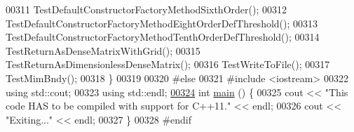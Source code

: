 \begin{DoxyCode}
00311   TestDefaultConstructorFactoryMethodSixthOrder();
00312   TestDefaultConstructorFactoryMethodEightOrderDefThreshold();
00313   TestDefaultConstructorFactoryMethodTenthOrderDefThreshold();
00314   TestReturnAsDenseMatrixWithGrid();
00315   TestReturnAsDimensionlessDenseMatrix();
00316   TestWriteToFile();
00317   TestMimBndy();
00318 \}
00319 
00320 \textcolor{preprocessor}{#else}
00321 \textcolor{preprocessor}{#include <iostream>}
00322 \textcolor{keyword}{using} std::cout;
00323 \textcolor{keyword}{using} std::endl;
\hypertarget{mtk__grad__1d__test_8cc_source_l00324}{}\hyperlink{mtk__grad__1d__test_8cc_ae66f6b31b5ad750f1fe042a706a4e3d4}{00324} \textcolor{keywordtype}{int} \hyperlink{mtk__grad__1d__test_8cc_ae66f6b31b5ad750f1fe042a706a4e3d4}{main} () \{
00325   cout << \textcolor{stringliteral}{"This code HAS to be compiled with support for C++11."} << endl;
00326   cout << \textcolor{stringliteral}{"Exiting..."} << endl;
00327 \}
00328 \textcolor{preprocessor}{#endif}
\end{DoxyCode}
